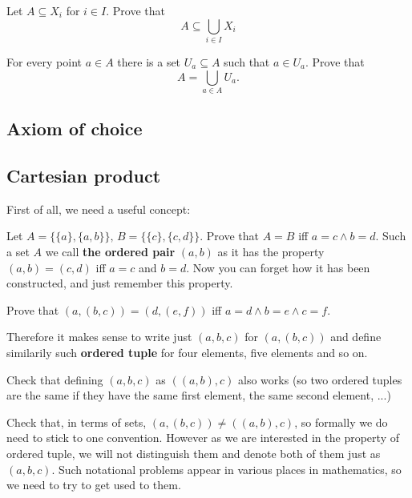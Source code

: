 \begin{exercise}
	Let $A\subseteq X_i$ for $i\in I$. Prove that
	$$A\subseteq \bigcup_{i\in I} X_i$$
\end{exercise}

\begin{exercise}
	For every point $a\in A$ there is a set $U_a\subseteq A$ such that $a\in U_a$.
	Prove that $$A=\bigcup_{a\in A} U_a.$$
\end{exercise}

\subsection{Axiom of choice}



\subsection{Cartesian product}
First of all, we need a useful concept:
\begin{prob}
	Let $A=\{\{a\}, \{a,b\}\},\, B=\{\{c\},\{c,d\}\}$. Prove that $A=B$ iff $a=c\wedge b=d$. Such a set $A$ we call
	\textbf{the ordered pair} $(a,b)$ as it has the property $(a,b)=(c,d)$ iff $a=c$ and $b=d$.
	Now you can forget how it has been constructed, and just remember this property.
\end{prob}

\begin{prob}
Prove that $(a,(b,c))=(d,(e,f))$ iff $a=d\wedge b=e\wedge c=f$.
\end{prob}
\noindent Therefore it makes sense to write just
$(a,b,c)$ for $(a,(b,c))$ and define similarily such \textbf{ordered tuple} for four elements, five elements
and so on.
\begin{prob}
Check that defining $(a,b,c)$ as $((a,b),c)$ also works (so two ordered tuples are the same if they have the
same first element, the same second element, ...)
\end{prob}
\begin{prob}
Check that, in terms of sets, $(a,(b,c))\neq ((a,b),c)$, so formally we do need to stick to one convention.
However as we are interested in the property of ordered tuple, we will not distinguish them and denote both
of them just as $(a,b,c)$. Such notational problems appear in various places in mathematics, so we need to
try to get used to them.
\end{prob}

